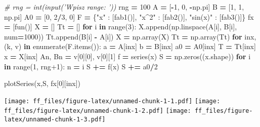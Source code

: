 \documentclass[]{article}
\newenvironment{Shaded}{\begin{snugshade}}{\end{snugshade}}
\newcommand{\DecValTok}[1]{\textcolor[rgb]{0.00,0.00,0.81}{{#1}}}
\newcommand{\StringTok}[1]{\textcolor[rgb]{0.31,0.60,0.02}{{#1}}}
\newcommand{\CommentTok}[1]{\textcolor[rgb]{0.56,0.35,0.01}{\textit{{#1}}}}
\newcommand{\ControlFlowTok}[1]{\textcolor[rgb]{0.13,0.29,0.53}{\textbf{{#1}}}}
\newcommand{\OperatorTok}[1]{\textcolor[rgb]{0.81,0.36,0.00}{\textbf{{#1}}}}
\newcommand{\BuiltInTok}[1]{{#1}}
\newcommand{\NormalTok}[1]{{#1}}
\begin{document}
\begin{Shaded}
\begin{Highlighting}[]
\CommentTok{# rng = int(input('Wpisz range: '))}
\NormalTok{rng }\OperatorTok{=} \DecValTok{100}
\NormalTok{A }\OperatorTok{=} \NormalTok{[}\OperatorTok{-}\DecValTok{1}\NormalTok{, }\DecValTok{0}\NormalTok{, }\OperatorTok{-}\NormalTok{np.pi]}
\NormalTok{B }\OperatorTok{=} \NormalTok{[}\DecValTok{1}\NormalTok{, }\DecValTok{1}\NormalTok{, np.pi]}
\NormalTok{A0 }\OperatorTok{=} \NormalTok{[}\DecValTok{0}\NormalTok{, }\DecValTok{2}\OperatorTok{/}\DecValTok{3}\NormalTok{, }\DecValTok{0}\NormalTok{] }
\NormalTok{F }\OperatorTok{=} \NormalTok{\{}\StringTok{"x"} \NormalTok{: [fab1()], }\StringTok{"x^2"} \NormalTok{: [fab2()], }\StringTok{"sin(x)"} \NormalTok{: [fab3()]\}}
\NormalTok{fx }\OperatorTok{=} \NormalTok{[fun()]}
\NormalTok{X }\OperatorTok{=} \NormalTok{[]}
\NormalTok{Tt }\OperatorTok{=} \NormalTok{[]}
\ControlFlowTok{for} \NormalTok{i }\OperatorTok{in} \BuiltInTok{range}\NormalTok{(}\DecValTok{3}\NormalTok{):}
    \NormalTok{X.append(np.linspace(A[i], B[i], num}\OperatorTok{=}\DecValTok{1000}\NormalTok{))}
    \NormalTok{Tt.append(B[i] }\OperatorTok{-} \NormalTok{A[i])}
\NormalTok{X }\OperatorTok{=} \NormalTok{np.array(X)}
\NormalTok{Tt }\OperatorTok{=} \NormalTok{np.array(Tt)}
\ControlFlowTok{for} \NormalTok{inx, (k, v) }\OperatorTok{in} \BuiltInTok{enumerate}\NormalTok{(F.items()):}
    \NormalTok{a }\OperatorTok{=} \NormalTok{A[inx] }
    \NormalTok{b }\OperatorTok{=} \NormalTok{B[inx]}
    \NormalTok{a0 }\OperatorTok{=} \NormalTok{A0[inx]}
    \NormalTok{T }\OperatorTok{=} \NormalTok{Tt[inx] }
    \NormalTok{x }\OperatorTok{=} \NormalTok{X[inx]}
    \NormalTok{An, Bn }\OperatorTok{=} \NormalTok{v[}\DecValTok{0}\NormalTok{][}\DecValTok{0}\NormalTok{], v[}\DecValTok{0}\NormalTok{][}\DecValTok{1}\NormalTok{]}
    \NormalTok{f }\OperatorTok{=} \NormalTok{series(x)}
    \NormalTok{S }\OperatorTok{=} \NormalTok{np.zeros((x.shape))}
    \ControlFlowTok{for} \NormalTok{i }\OperatorTok{in} \BuiltInTok{range}\NormalTok{(}\DecValTok{1}\NormalTok{, rng}\DecValTok{+1}\NormalTok{):}
        \NormalTok{n }\OperatorTok{=} \NormalTok{i}
        \NormalTok{S }\OperatorTok{+=} \NormalTok{f(x)}
    \NormalTok{S }\OperatorTok{+=} \NormalTok{a0}\OperatorTok{/}\DecValTok{2}
    
    \NormalTok{plotSeries(x,S, fx[}\DecValTok{0}\NormalTok{][inx])}
\end{Highlighting}
\end{Shaded}

\texttt{[image: ff\_files/figure-latex/unnamed-chunk-1-1.pdf]}
\texttt{[image: ff\_files/figure-latex/unnamed-chunk-1-2.pdf]}
\texttt{[image: ff\_files/figure-latex/unnamed-chunk-1-3.pdf]}
\end{document}
